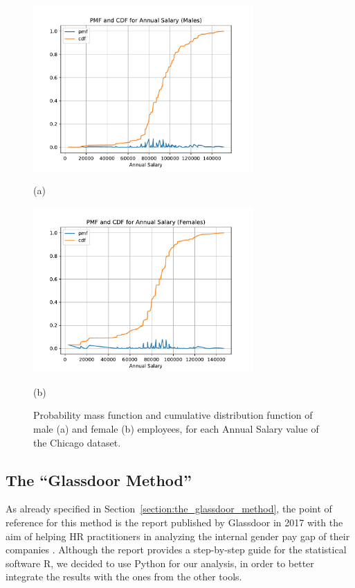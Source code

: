 \begin{figure}[t!]
\centering
\includegraphics[width=0.75\textwidth]{figures/chicago_pmf_cdf_annual_salary_males.pdf}
\caption*{(a)}
\includegraphics[width=0.75\textwidth]{figures/chicago_pmf_cdf_annual_salary_females.pdf}
\caption*{(b)}
\caption{Probability mass function and cumulative distribution function of male (a) and female (b) employees, for each \textrm{Annual Salary} value of the Chicago dataset.}
\label{fig:chicago_preprocessing2}
\end{figure}


\subsection{The ``Glassdoor Method''}
As already specified in Section~\ref{section:the_glassdoor_method}, the point of reference for this method is the report published by Glassdoor in 2017 with the aim of helping HR practitioners in analyzing the internal gender pay gap of their companies \cite{chamberlain2017analyze}. Although the report provides a step-by-step guide for the statistical software R, we decided to use Python for our analysis, in order to better integrate the results with the ones from the other tools.

